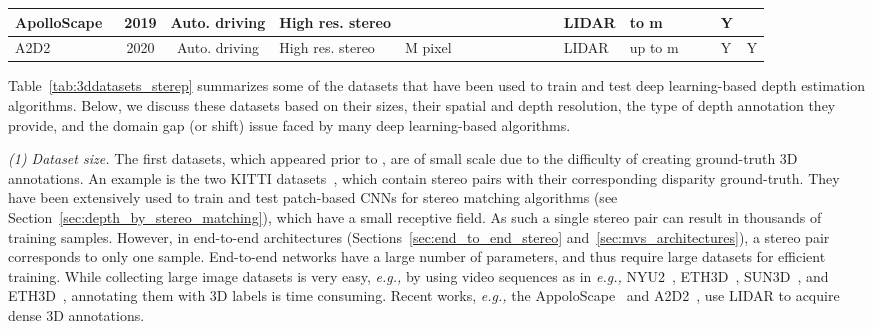 \documentclass[10pt,journal,compsoc]{IEEEtran}
\newcommand{\eg}{\emph{e.g., }}
\newcommand{\noi}{\noindent}
\begin{document}
\begin{table*}[t]
{\begin{tabular}{@{}p{8.5em}@{ }c@{ } c@{ }p{11.915em}c@{ }p{7.5em}@{ }p{5.335em}@{ }p{5.5em}c@{ }c@{ }l@{ }p{8.665em}lll @{ }l  @{ }l@{ }l@{}}
  \hline
  ApolloScape~\cite{wang2019apolloscape} & 2019 & \multicolumn{1}{p{7em}}{Auto. driving}   & \multicolumn{1}{p{11.915em}}{High res. stereo} & \multicolumn{1}{c}{} &   \multicolumn{1}{p{7.5em}}{} &  \multicolumn{1}{p{5.335em}}{} & \multicolumn{1}{p{5.585em}}{} &  \multicolumn{1}{c}{}  & &  
   \multicolumn{1}{l}{} & \multicolumn{1}{l}{} & LIDAR &  to m &      &    & \multicolumn{1}{l}{Y} & \multicolumn{1}{l}{}  \\
  \hline
  A2D2~\cite{geyer2020a2d2} & 2020 & \multicolumn{1}{p{7em}}{Auto. driving}   & \multicolumn{1}{p{11.915em}}{High res. stereo} & \multicolumn{1}{c}{M pixel} &   \multicolumn{1}{p{7.5em}}{} &  \multicolumn{1}{p{5.335em}}{} & \multicolumn{1}{p{5.585em}}{} &  \multicolumn{1}{c}{}  & &  
   \multicolumn{1}{l}{} & \multicolumn{1}{l}{} & LIDAR & up to m &      &    & \multicolumn{1}{l}{Y} & \multicolumn{1}{l}{Y}  \\
 \bottomrule
 \end{tabular}}
\end{table*}	

Table~\ref{tab:3ddatasets_sterep} summarizes some of the datasets that have been used to train and test deep learning-based depth estimation algorithms. Below, we discuss these datasets based on their sizes, their spatial and depth resolution, the type of depth annotation they provide, and the domain gap (or shift) issue faced by many deep learning-based algorithms.  



\vspace{6pt}
\noi\textit{(1) Dataset size. }  The first datasets, which appeared prior to , are of small scale due to the difficulty of creating ground-truth 3D annotations. An example is the two KITTI datasets~\cite{geiger2012we,menze2015object}, which contain  stereo pairs with their corresponding disparity ground-truth.   They have been extensively used to train and test patch-based CNNs for stereo matching algorithms (see Section~\ref{sec:depth_by_stereo_matching}), which have a small receptive field. As such a  single stereo pair can result in thousands of training samples.  However, in end-to-end architectures (Sections~\ref{sec:end_to_end_stereo} and~\ref{sec:mvs_architectures}), a stereo pair  corresponds to only one sample.  End-to-end networks have a large number of parameters, and thus require large datasets for efficient training.  While collecting large image datasets is very easy, \eg by using video sequences as in \eg NYU2~\cite{silberman2012indoor}, ETH3D~\cite{schops2017multi}, SUN3D~\cite{xiao2013sun3d}, and ETH3D~\cite{schops2017multi}, annotating them with 3D labels is time consuming.  Recent works, \eg the AppoloScape~\cite{wang2019apolloscape} and A2D2~\cite{geyer2020a2d2}, use LIDAR to  acquire dense 3D annotations.  
\end{document}
